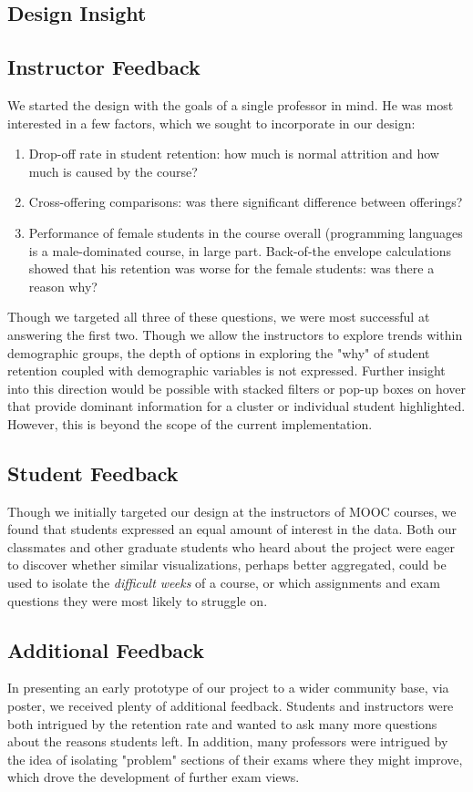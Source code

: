 
\subsection{Design Insight}

\subsection{Instructor Feedback}
We started the design with the goals of a single professor in mind. He was most interested in a few factors, which we sought to incorporate in our design:
\begin{enumerate}
\item{} Drop-off rate in student retention: how much is normal attrition and how much is caused by the course?
\item{} Cross-offering comparisons: was there significant difference between offerings?
\item{} Performance of female students in the course overall (programming languages is a male-dominated course, in large part. Back-of-the envelope calculations showed that his retention was worse for the female students: was there a reason why?
\end{enumerate}
Though we targeted all three of these questions, we were most successful at answering the first two. Though we allow the instructors to explore trends within demographic groups, the depth of options in exploring the "why" of student retention coupled with demographic variables is not expressed. Further insight into this direction would be possible with stacked filters or pop-up boxes on hover that provide dominant information for a cluster or individual student highlighted. However, this is beyond the scope of the current implementation. 

\subsection{Student Feedback}
Though we initially targeted our design at the instructors of MOOC courses, we found that students 
expressed an equal amount of interest in the data. Both our classmates and other graduate students
who heard about the project were eager to discover whether similar visualizations, perhaps better 
aggregated, could be used to isolate the \emph{difficult weeks} of a course, or which assignments and 
exam questions they were most likely to struggle on. 

\subsection{Additional Feedback}
In presenting an early prototype of our project to a wider community base, via poster, we received plenty of additional feedback. Students and instructors were both intrigued by the retention rate and wanted to ask many more questions about the reasons students left. In addition, many professors were intrigued by the idea of isolating "problem" sections of their exams where they might improve, which drove the development of further exam views. 

